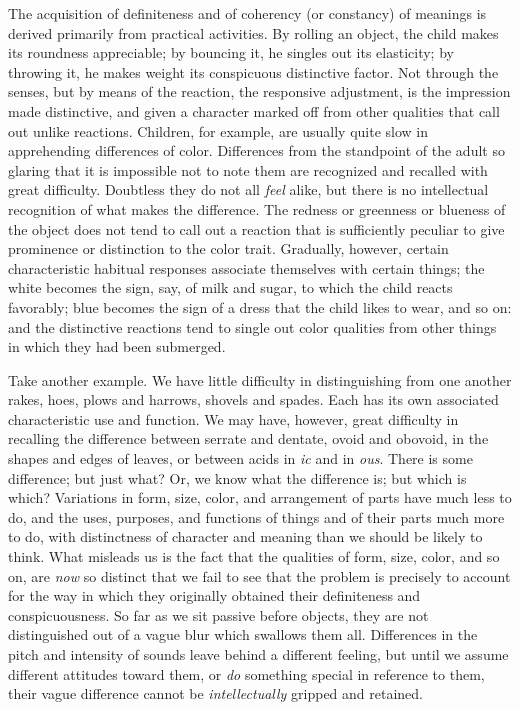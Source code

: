 \documentclass[showtrims,ustradepaper]{memoir}
\begin{document}

The acquisition of definiteness and of coherency (or constancy) of
meanings is derived primarily from practical activities. By rolling an
object, the child makes its roundness appreciable; by bouncing it, he
singles out its elasticity; by throwing it, he makes weight its
conspicuous distinctive factor. Not through the senses, but by means of
the reaction, the responsive adjustment, is the impression made
distinctive, and given a character marked off from other qualities that
call out unlike reactions. Children, for example, are usually quite slow
in apprehending differences of color. Differences from the standpoint of
the adult so glaring that it is impossible not to note them are
recognized and recalled with great difficulty. Doubtless they do not all
\emph{feel} alike, but there is no intellectual recognition of what
makes the difference. The redness or greenness or blueness of the object
does not tend to call out a reaction that is sufficiently peculiar to
give prominence or distinction to the color trait. Gradually, however,
certain characteristic habitual responses associate themselves with
certain things; the white becomes the sign, say, of milk and sugar, to
which the child reacts favorably; blue becomes the sign of a dress that
the child likes to wear, and so on: and
the
distinctive reactions tend to single out color qualities from other
things in which they had been submerged.


Take another example. We have little difficulty in distinguishing from
one another rakes, hoes, plows and harrows, shovels and spades. Each has
its own associated characteristic use and function. We may have,
however, great difficulty in recalling the difference between serrate
and dentate, ovoid and obovoid, in the shapes and edges of leaves, or
between acids in \emph{ic} and in \emph{ous}. There is some difference;
but just what? Or, we know what the difference is; but which is which?
Variations in form, size, color, and arrangement of parts have much less
to do, and the uses, purposes, and functions of things and of their
parts much more to do, with distinctness of character and meaning than
we should be likely to think. What misleads us is the fact that the
qualities of form, size, color, and so on, are \emph{now} so distinct
that we fail to see that the problem is precisely to account for the way
in which they originally obtained their definiteness and
conspicuousness. So far as we sit passive before objects, they are not
distinguished out of a vague blur which swallows them all. Differences
in the pitch and intensity of sounds leave behind a different feeling,
but until we assume different attitudes toward them, or \emph{do}
something special in reference to them, their vague difference cannot be
\emph{intellectually} gripped and retained.
\end{document}
